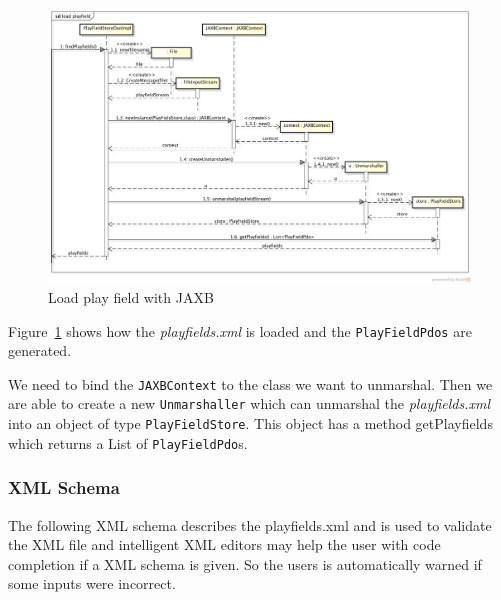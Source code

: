 \documentclass[fontsize=12pt,
               paper=a4,
               twoside=false,
               parskip=half,
               ]{scrartcl}
\begin{document}
\begin{figure}[h!]
	\centering
	\includegraphics[width=15.5cm]{./img/jaxb-load-playfield-sd.png}
	\caption[Load play field]{Load play field with JAXB}
	\label{fig:load_playfield}
\end{figure}

Figure~\ref{fig:load_playfield} shows how the \emph{playfields.xml} is loaded and the \texttt{PlayFieldPdos} are generated.

We need to bind the \texttt{JAXBContext} to the class we want to unmarshal. Then we are able to create a new \texttt{Unmarshaller} which can unmarshal the \emph{playfields.xml} into an object of type \texttt{PlayFieldStore}. This object has a method getPlayfields which returns a List of \texttt{PlayFieldPdo}s.


\subsubsection{XML Schema}

The following XML schema describes the playfields.xml and is used to validate the XML file and intelligent XML editors may help the user with code completion if a XML schema is given. So the users is automatically warned if some inputs were incorrect.
\end{document}
